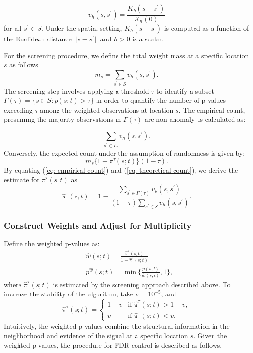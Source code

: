 \documentclass[11pt]{article}
\begin{document}
\begin{equation}
	v_h(s,s^{\prime})=\frac{K_h(s-s^{\prime})}{K_h(0)}
\end{equation}
for all $s^{\prime} \in S$. Under the spatial setting, $K_h(s-s^{\prime})$ is computed as a function of the Euclidean distance $||s-s^{\prime}||$ and $h>0$ is a scalar.

For the screening procedure,  we define the total weight mass at a specific location $s$ as follows:
\begin{equation}
	m_s=\sum_{s^{\prime}\in S}v_h(s,s^{\prime}).
\end{equation}
The screening step involves applying a threshold $\tau$ to identify a subset $\Gamma(\tau)=\{s\in S:p(s;t)>\tau\}$ in order to quantify the number of p-values exceeding $\tau$ among the weighted observations at location $s$. The empirical count, presuming the majority observations in $\Gamma(\tau)$ are non-anomaly, is calculated as:
 
 \begin{equation}\label{eq: empirical count}
 	\sum_{s^{\prime}\in \Gamma_{\tau}}v_h(s,s^{\prime}).
 \end{equation}
 Conversely, the expected count under the assumption of randomness is given by:
 \begin{equation}\label{eq: theoretical count}
 	m_s\{1-\pi^{\tau}(s;t)\}(1-\tau).
 \end{equation}
By equating (\ref{eq: empirical count}) and (\ref{eq: theoretical count}), we derive the estimate for $\pi^{\tau}(s;t)$ as:
\begin{equation}
	\hat{\pi}^{\tau}(s;t)=1-\frac{\sum_{s^{\prime}\in \Gamma(\tau)}v_h(s,s^{\prime})}{(1-\tau)\sum_{s^{\prime}\in S}v_h(s,s^{\prime})}.
\end{equation}

 
 
 

\subsubsection*{Construct Weights and Adjust for Multiplicity}

Define the weighted p-values as:
\begin{align}
	&\hat{w}(s;t)=\frac{\hat{\pi}^{\tau}(s;t)}{1-\hat{\pi}^{\tau}(s;t)}\\
	&p^{\hat{w}}(s;t)=\min\{\frac{p(s;t)}{\hat{w}(s;t)},1\},
\end{align}
where $\hat{\pi}^{\tau}(s;t)$ is estimated by the screening approach described above. To increase the stability of the algorithm, take  $v=10^{-5}$, and 
\begin{equation}
	\hat{\pi}^{\tau}(s;t) = 
\begin{cases} 
1-v & \text{if } \hat{\pi}^{\tau}(s;t)>1-v, \\
v & \text{if } \hat{\pi}^{\tau}(s;t) < v.
\end{cases}
\end{equation}
Intuitively, the weighted p-values combine the structural information in the neighborhood and evidence of the signal at a specific location $s$. Given the weighted p-values,
the procedure for FDR control is described as follows.
\end{document}
